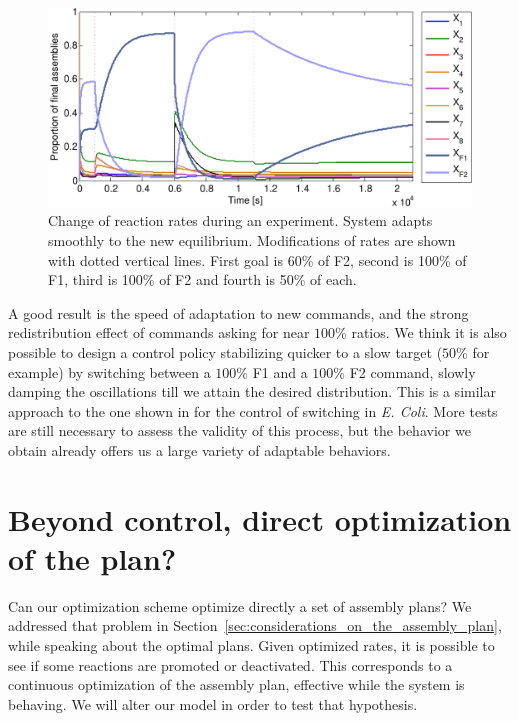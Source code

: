     \begin{figure}[h!]
        \centering
            \includegraphics[width=13cm]{img/optim_online_adaptation.pdf}
        \caption{Change of reaction rates during an experiment. System adapts smoothly to the new equilibrium. Modifications of rates are shown with dotted vertical lines. First goal is 60\% of F2, second is 100\% of F1, third is 100\% of F2 and fourth is 50\% of each.}
        \label{fig:optim_online_adaptation}
    \end{figure}

    A good result is the speed of adaptation to new commands, and the strong redistribution effect of commands asking for near $100\%$ ratios. We think it is also possible to design a control policy stabilizing quicker to a slow target ($50\%$ for example) by switching between a $100\%$ F1 and a $100\%$ F2 command, slowly damping the oscillations till we attain the desired distribution. This is a similar approach to the one shown in \cite{Julius:2007p4774, Julius:2008p4775} for the control of switching in \textit{E. Coli}. More tests are still necessary to assess the validity of this process, but the behavior we obtain already offers us a large variety of adaptable behaviors.






\section{Beyond control, direct optimization of the plan?} %
\label{sec:beyond_control_direct_optimization_of_the_plan_}
    Can our optimization scheme optimize directly a set of assembly plans? We addressed that problem in Section~\ref{sec:considerations_on_the_assembly_plan}, while speaking about the optimal plans. Given optimized rates, it is possible to see if some reactions are promoted or deactivated. This corresponds to a continuous optimization of the assembly plan, effective while the system is behaving. We will alter our model in order to test that hypothesis.

